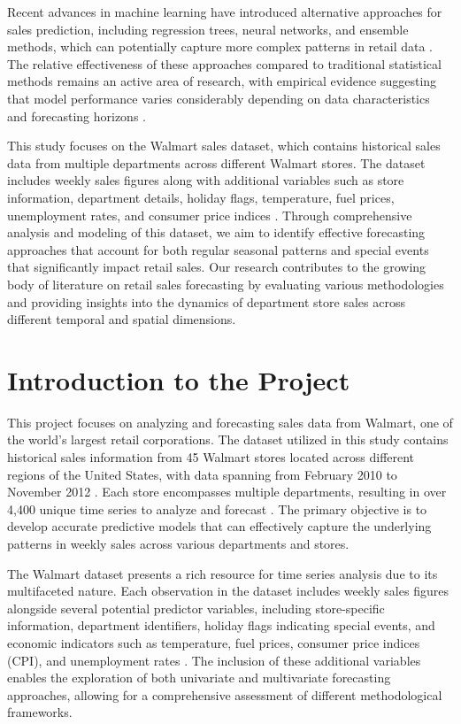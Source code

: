 Recent advances in machine learning have introduced alternative approaches for sales prediction, including regression trees, neural networks, and ensemble methods, which can potentially capture more complex patterns in retail data \cite{Pao:2017}. The relative effectiveness of these approaches compared to traditional statistical methods remains an active area of research, with empirical evidence suggesting that model performance varies considerably depending on data characteristics and forecasting horizons \cite{Fildes:2019}.

This study focuses on the Walmart sales dataset, which contains historical sales data from multiple departments across different Walmart stores. The dataset includes weekly sales figures along with additional variables such as store information, department details, holiday flags, temperature, fuel prices, unemployment rates, and consumer price indices \cite{Loyal:2017}. Through comprehensive analysis and modeling of this dataset, we aim to identify effective forecasting approaches that account for both regular seasonal patterns and special events that significantly impact retail sales. Our research contributes to the growing body of literature on retail sales forecasting by evaluating various methodologies and providing insights into the dynamics of department store sales across different temporal and spatial dimensions.

\section{Introduction to the Project}

This project focuses on analyzing and forecasting sales data from Walmart, one of the world's largest retail corporations. The dataset utilized in this study contains historical sales information from 45 Walmart stores located across different regions of the United States, with data spanning from February 2010 to November 2012 \cite{Zhang:2021}. Each store encompasses multiple departments, resulting in over 4,400 unique time series to analyze and forecast \cite{Loyal:2017}. The primary objective is to develop accurate predictive models that can effectively capture the underlying patterns in weekly sales across various departments and stores.

The Walmart dataset presents a rich resource for time series analysis due to its multifaceted nature. Each observation in the dataset includes weekly sales figures alongside several potential predictor variables, including store-specific information, department identifiers, holiday flags indicating special events, and economic indicators such as temperature, fuel prices, consumer price indices (CPI), and unemployment rates \cite{Zhang:2021}. The inclusion of these additional variables enables the exploration of both univariate and multivariate forecasting approaches, allowing for a comprehensive assessment of different methodological frameworks.

